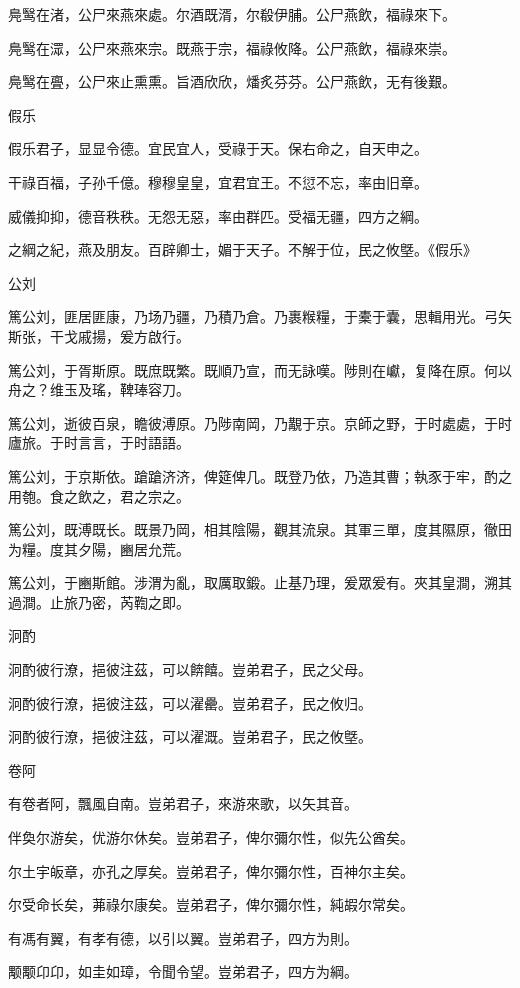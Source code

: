 鳧鹥在渚，公尸來燕來處。尔酒既湑，尔殽伊脯。公尸燕飲，福祿來下。

鳧鹥在潀，公尸來燕來宗。既燕于宗，福祿攸降。公尸燕飲，福祿來崇。

鳧鹥在亹，公尸來止熏熏。旨酒欣欣，燔炙芬芬。公尸燕飲，无有後艱。

假乐

假乐君子，显显令德。宜民宜人，受祿于天。保右命之，自天申之。

干祿百福，子孙千億。穆穆皇皇，宜君宜王。不愆不忘，率由旧章。

威儀抑抑，德音秩秩。无怨无惡，率由群匹。受福无疆，四方之綱。

之綱之紀，燕及朋友。百辟卿士，媚于天子。不解于位，民之攸墍。《假乐》

公刘

篤公刘，匪居匪康，乃场乃疆，乃積乃倉。乃裹糇糧，于橐于囊，思輯用光。弓矢斯张，干戈戚揚，爰方啟行。

篤公刘，于胥斯原。既庶既繁。既順乃宣，而无詠嘆。陟則在巘，复降在原。何以舟之？维玉及瑤，鞞琫容刀。

篤公刘，逝彼百泉，瞻彼溥原。乃陟南岡，乃覯于京。京師之野，于时處處，于时廬旅。于时言言，于时語語。

篤公刘，于京斯依。蹌蹌济济，俾筵俾几。既登乃依，乃造其曹；執豕于牢，酌之用匏。食之飲之，君之宗之。

篤公刘，既溥既长。既景乃岡，相其陰陽，觀其流泉。其軍三單，度其隰原，徹田为糧。度其夕陽，豳居允荒。

篤公刘，于豳斯館。涉渭为亂，取厲取鍛。止基乃理，爰眾爰有。夾其皇澗，溯其過澗。止旅乃密，芮鞫之即。

泂酌

泂酌彼行潦，挹彼注茲，可以餴饎。豈弟君子，民之父母。

泂酌彼行潦，挹彼注茲，可以濯罍。豈弟君子，民之攸归。

泂酌彼行潦，挹彼注茲，可以濯溉。豈弟君子，民之攸墍。

卷阿

有卷者阿，飄風自南。豈弟君子，來游來歌，以矢其音。

伴奐尔游矣，优游尔休矣。豈弟君子，俾尔彌尔性，似先公酋矣。

尔土宇皈章，亦孔之厚矣。豈弟君子，俾尔彌尔性，百神尔主矣。

尔受命长矣，茀祿尔康矣。豈弟君子，俾尔彌尔性，純嘏尔常矣。

有馮有翼，有孝有德，以引以翼。豈弟君子，四方为則。

颙颙卬卬，如圭如璋，令聞令望。豈弟君子，四方为綱。

